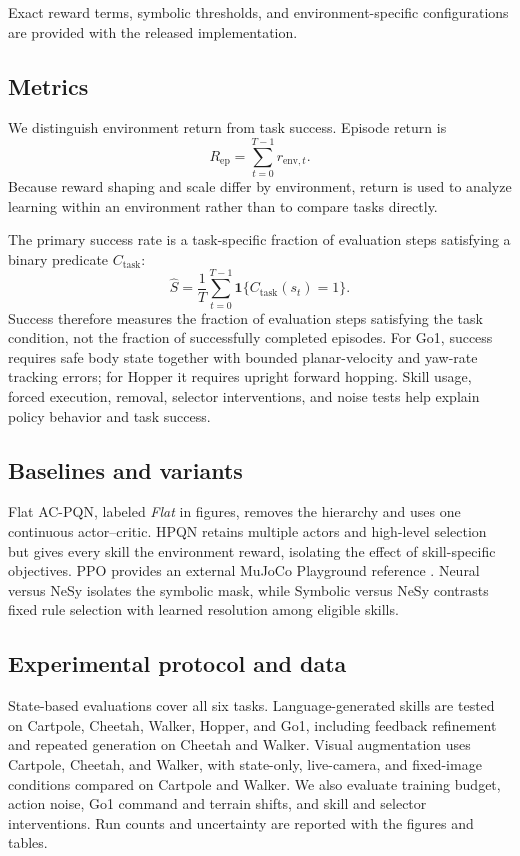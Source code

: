 \documentclass[conference,letterpaper,10pt]{IEEEtran}
\begin{document}
Exact reward terms, symbolic thresholds, and environment-specific configurations are provided with the released implementation.


\subsection{Metrics}
We distinguish environment return from task success. Episode return is
\begin{equation}
R_{\mathrm{ep}}=\sum_{t=0}^{T-1}r_{\mathrm{env},t}.
\end{equation}
Because reward shaping and scale differ by environment, return is used to analyze learning within an environment rather than to compare tasks directly.

The primary success rate is a task-specific fraction of evaluation steps satisfying a binary predicate $C_{\mathrm{task}}$:
\begin{equation}
\hat S=\frac{1}{T}\sum_{t=0}^{T-1}\mathbf{1}\{C_{\mathrm{task}}(s_t)=1\}.
\label{eq:success}
\end{equation}
Success therefore measures the fraction of evaluation steps satisfying the task condition, not the fraction of successfully completed episodes. For Go1, success requires safe body state together with bounded planar-velocity and yaw-rate tracking errors; for Hopper it requires upright forward hopping. Skill usage, forced execution, removal, selector interventions, and noise tests help explain policy behavior and task success.

\subsection{Baselines and variants}
Flat AC-PQN, labeled \emph{Flat} in figures, removes the hierarchy and uses one continuous actor--critic. HPQN retains multiple actors and high-level selection but gives every skill the environment reward, isolating the effect of skill-specific objectives. PPO provides an external MuJoCo Playground reference \cite{ppo,playground}. Neural versus NeSy isolates the symbolic mask, while Symbolic versus NeSy contrasts fixed rule selection with learned resolution among eligible skills.

\subsection{Experimental protocol and data}
State-based evaluations cover all six tasks. Language-generated skills are tested on Cartpole, Cheetah, Walker, Hopper, and Go1, including feedback refinement and repeated generation on Cheetah and Walker. Visual augmentation uses Cartpole, Cheetah, and Walker, with state-only, live-camera, and fixed-image conditions compared on Cartpole and Walker. We also evaluate training budget, action noise, Go1 command and terrain shifts, and skill and selector interventions. Run counts and uncertainty are reported with the figures and tables.
\end{document}
